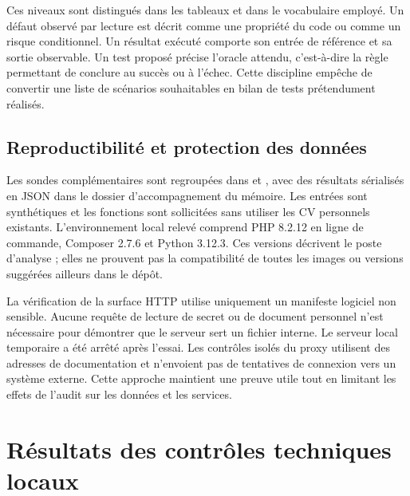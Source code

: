 Ces niveaux sont distingués dans les tableaux et dans le vocabulaire employé. Un défaut observé par lecture est décrit comme une propriété du code ou comme un risque conditionnel. Un résultat exécuté comporte son entrée de référence et sa sortie observable. Un test proposé précise l'oracle attendu, c'est-à-dire la règle permettant de conclure au succès ou à l'échec. Cette discipline empêche de convertir une liste de scénarios souhaitables en bilan de tests prétendument réalisés.

\subsection{Reproductibilité et protection des données}

Les sondes complémentaires sont regroupées dans  et , avec des résultats sérialisés en JSON dans le dossier d'accompagnement du mémoire. Les entrées sont synthétiques et les fonctions sont sollicitées sans utiliser les CV personnels existants. L'environnement local relevé comprend PHP 8.2.12 en ligne de commande, Composer 2.7.6 et Python 3.12.3. Ces versions décrivent le poste d'analyse ; elles ne prouvent pas la compatibilité de toutes les images ou versions suggérées ailleurs dans le dépôt.

La vérification de la surface HTTP utilise uniquement un manifeste logiciel non sensible. Aucune requête de lecture de secret ou de document personnel n'est nécessaire pour démontrer que le serveur sert un fichier interne. Le serveur local temporaire a été arrêté après l'essai. Les contrôles isolés du proxy utilisent des adresses de documentation et n'envoient pas de tentatives de connexion vers un système externe. Cette approche maintient une preuve utile tout en limitant les effets de l'audit sur les données et les services.

\section{Résultats des contrôles techniques locaux}

